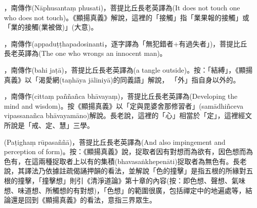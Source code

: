 \startitemgroup[noteitems]
\item{}，南傳作(Nāphusantaṃ phusati)，菩提比丘長老英譯為(It does not touch one who does not touch)。《顯揚真義》解說，這裡的「接觸」指「業果報的接觸」或「業的接觸(業被做)」(大意)。
\stopitemgroup

\startitemgroup[noteitems]
\item{}，南傳作(appaduṭṭhapadosinanti，逐字譯為「無犯錯者+有過失者」)，菩提比丘長老英譯為(The one who wrongs an innocent man)。
\stopitemgroup

\startitemgroup[noteitems]
\item{}，南傳作(bahi jaṭā)，菩提比丘長老英譯為(a tangle outside)。按：「結縛」，《顯揚真義》以「渴愛網(taṇhāya jāliniyā)的同義語」解說， 「外」指自身以外的。
\stopitemgroup

\startitemgroup[noteitems]
\item{}，南傳作(cittaṃ paññañca bhāvayaṃ)，菩提比丘長老英譯為(Developing the mind and wisdom)。按《顯揚真義》以「定與毘婆舍那修習者」(samādhiñceva vipassanañca bhāvayamāno)解說。長老說，這裡的「心」相當於「定」，這裡經文所說是「戒、定、慧」三學。
\stopitemgroup

\startitemgroup[noteitems]
\item{}(Paṭighaṃ rūpasaññā)，菩提比丘長老英譯為(And also impingement and perception of form)。按：《顯揚真義》說，捉取者因有對想而為欲有，因色想而為色有，在這兩種捉取者上以有的集積(bhavasaṅkhepenāti)捉取者為無色有。長老說，其譯法乃依據註疏偈誦押韻的看法，並解說「色的撞擊」是指五根的所緣對五根的撞擊，「撞擊想」則引《清淨道論》第十章的內容(按：即色想、聲想、氣味想、味道想、所觸想的有對想)，「色想」的範圍很廣，包括禪定中的地遍處等，結論還是回到《顯揚真義》的看法，意指三界眾生。
\stopitemgroup

